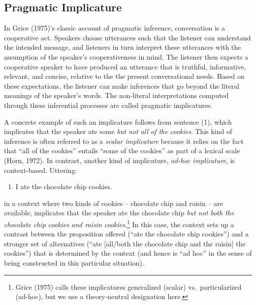 \documentclass[mask,man]{apa6}
\providecommand{\tightlist}{%
  \setlength{\itemsep}{0pt}\setlength{\parskip}{0pt}}
\begin{document}
\subsection{Pragmatic Implicature}\label{pragmatic-implicature}

In Grice (1975)'s classic account of pragmatic inference, conversation
is a cooperative act. Speakers choose utterances such that the listener
can understand the intended message, and listeners in turn interpret
these utterances with the assumption of the speaker's cooperativeness in
mind. The listener then expects a cooperative speaker to have produced
an utterance that is truthful, informative, relevant, and concise,
relative to the the present conversational needs. Based on these
expectations, the listener can make inferences that go beyond the
literal meanings of the speaker's words. The non-literal interpretations
computed through these inferential processes are called pragmatic
implicatures.

A concrete example of such an implicature follows from sentence (1),
which implicates that the speaker ate some \emph{but not all of the
cookies}. This kind of inference is often referred to as a \emph{scalar
implicature} because it relies on the fact that \enquote{all of the
cookies} entails \enquote{some of the cookies} as part of a lexical
scale (Horn, 1972). In contrast, another kind of implicature,
\emph{ad-hoc implicature}, is context-based. Uttering:

\begin{enumerate}
\def\labelenumi{(\arabic{enumi})}
\setcounter{enumi}{1}
\tightlist
\item
  I ate the chocolate chip cookies.
\end{enumerate}

\noindent in a context where two kinds of cookies -- chocolate chip and
raisin -- are available, implicates that the speaker ate the chocolate
chip \emph{but not both the chocolate chip cookies and raisin
cookies}.\footnote{Grice (1975) calls these implicatures generalized
  (scalar) vs.~particularized (ad-hoc), but we use a theory-neutral
  designation here.} In this case, the context sets up a contrast
between the proposition offered (\enquote{ate the chocolate chip
cookies}) and a stronger set of alternatives (\enquote{ate {[}all/both
the chocolate chip and the raisin{]} the cookies}) that is determined by
the context (and hence is \enquote{ad hoc} in the sense of being
constructed in this particular situation).
\end{document}
